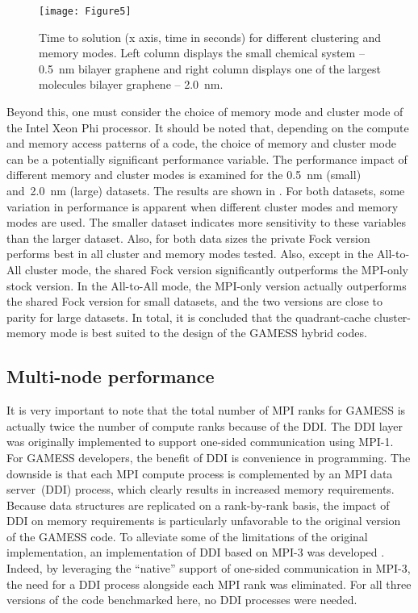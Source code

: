 \begin{figure}
	\texttt{[image: Figure5]}
	\caption{Time to solution (x axis, time in seconds) for different clustering and memory modes.
    		 Left column displays the small chemical system -- 0.5~nm bilayer graphene and
             right column displays one of the largest molecules bilayer graphene -- 2.0~nm.}
    \label{fig:tts}
\end{figure}

Beyond this, one must consider the choice of memory mode and cluster mode of the Intel Xeon Phi processor. It should be noted that, depending on the compute and memory access patterns of a code, the choice of memory and cluster mode can be a potentially significant performance variable. The performance impact of different memory and cluster modes is examined for the 0.5~nm (small) and~2.0~nm (large) datasets. The results are shown in . For both datasets, some variation in performance is apparent when different cluster modes and memory modes are used. The smaller dataset indicates more sensitivity to these variables than the larger dataset. Also, for both data sizes the private Fock version performs best in all cluster and memory modes tested. Also, except in the All-to-All cluster mode, the shared Fock version significantly outperforms the MPI-only stock version. In the All-to-All mode, the MPI-only version actually outperforms the shared Fock version for small datasets, and the two versions are close to parity for large datasets. In total, it is concluded that the quadrant-cache cluster-memory mode is best suited to the design of the GAMESS hybrid codes.

\subsection{Multi-node performance}
It is very important to note that the total number of MPI ranks for GAMESS is actually twice the number of compute ranks because of the DDI. The DDI layer was originally implemented to support one-sided communication using MPI-1. For GAMESS developers, the benefit of DDI is convenience in programming. The downside is that each MPI compute process is complemented by an MPI data server~(DDI) process, which clearly results in increased memory requirements. Because data structures are replicated on a rank-by-rank basis, the impact of DDI on memory requirements is particularly unfavorable to the original version of the GAMESS code. To alleviate some of the limitations of the original implementation, an implementation of DDI based on MPI-3 was developed \cite{pruitt2016private}. Indeed, by leveraging the ``native'' support of one-sided communication in MPI-3, the need for a DDI process alongside each MPI rank was eliminated. For all three versions of the code benchmarked here, no DDI processes were needed.

